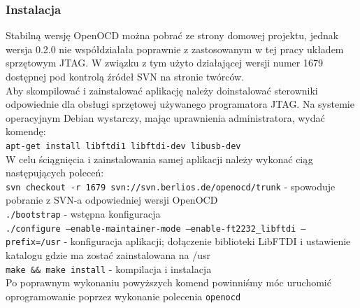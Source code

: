 \documentclass[a4paper,12pt]{book}
\begin{document}
				\subsubsection{Instalacja}
					Stabilną wersję OpenOCD można pobrać ze strony domowej projektu, jednak wersja 0.2.0 nie współdziałała poprawnie z zastosowanym w tej pracy układem sprzętowym JTAG. W związku z tym użyto działającej wersji numer 1679 dostępnej pod kontrolą źródeł SVN na stronie twórców.\\
					Aby skompilować i zainstalować aplikację należy doinstalować sterowniki odpowiednie dla obsługi sprzętowej używanego programatora JTAG. Na systemie operacyjnym Debian wystarczy, mając uprawnienia administratora, wydać komendę:\\
					\texttt{apt-get install libftdi1 libftdi-dev libusb-dev}\\
					W celu ściągnięcia i zainstalowania samej aplikacji należy wykonać ciąg następujących poleceń:\\
					\texttt{svn checkout -r 1679 svn://svn.berlios.de/openocd/trunk} - spowoduje pobranie z SVN-a odpowiedniej wersji OpenOCD\\
					\texttt{./bootstrap} - wstępna konfiguracja\\
					\texttt{./configure --enable-maintainer-mode --enable-ft2232\_libftdi --prefix=/usr} - konfiguracja aplikacji; dołączenie biblioteki LibFTDI i ustawienie katalogu gdzie ma zostać zainstalowana na /usr\\
					\texttt{make \&\& make install} - kompilacja i instalacja\\
					Po poprawnym wykonaniu powyższych komend powinniśmy móc uruchomić oprogramowanie poprzez wykonanie polecenia \texttt{openocd}
					
\end{document}
